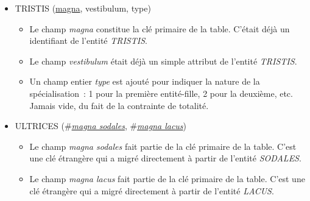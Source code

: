 \documentclass[a4paper]{article}
\newcommand{\relat}[1]{\textsc{#1}}
\newcommand{\attr}[1]{#1}
\newcommand{\prim}[1]{\uline{#1}}
\newcommand{\foreign}[1]{\#\textsl{#1}}
\begin{document}
\begin{itemize}
  \item \relat{TRISTIS} (\prim{magna}, \attr{vestibulum}, \attr{type})
  \begin{itemize}
    \item Le champ \emph{magna} constitue la clé primaire de la table. C'était déjà un identifiant de l'entité \emph{TRISTIS}.
    \item Le champ \emph{vestibulum} était déjà un simple attribut de l'entité \emph{TRISTIS}.
    \item Un champ entier \emph{type} est ajouté pour indiquer la nature de la spécialisation : 1 pour la première entité-fille, 2 pour la deuxième, etc. Jamais vide, du fait de la contrainte de totalité.
  \end{itemize}

  \item \relat{ULTRICES} (\foreign{\prim{magna sodales}}, \foreign{\prim{magna lacus}})
  \begin{itemize}
    \item Le champ \emph{magna sodales} fait partie de la clé primaire de la table. C'est une clé étrangère qui a migré directement à partir de l'entité \emph{SODALES}.
    \item Le champ \emph{magna lacus} fait partie de la clé primaire de la table. C'est une clé étrangère qui a migré directement à partir de l'entité \emph{LACUS}.
  \end{itemize}

\end{itemize}
\end{document}
